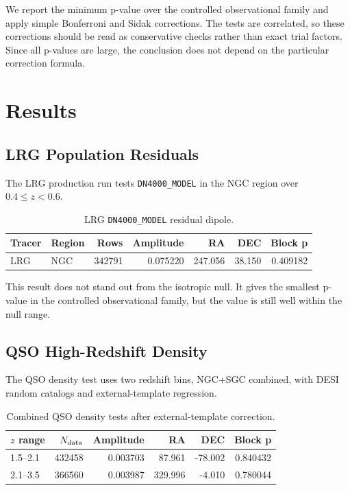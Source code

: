 \documentclass[11pt]{article}
\begin{document}
We report the minimum p-value over the controlled observational family and apply simple Bonferroni and Sidak corrections. The tests are correlated, so these corrections should be read as conservative checks rather than exact trial factors. Since all p-values are large, the conclusion does not depend on the particular correction formula.

\section{Results}

\subsection{LRG Population Residuals}

The LRG production run tests \texttt{DN4000\_MODEL} in the NGC region over $0.4 \le z < 0.6$.

\begin{table}[h]
\centering
\caption{LRG \texttt{DN4000\_MODEL} residual dipole.}
\begin{tabular}{llrrrrr}
\toprule
Tracer & Region & Rows & Amplitude & RA & DEC & Block p \\
\midrule
LRG & NGC & 342791 & 0.075220 & 247.056 & 38.150 & 0.409182 \\
\bottomrule
\end{tabular}
\end{table}

This result does not stand out from the isotropic null. It gives the smallest p-value in the controlled observational family, but the value is still well within the null range.

\subsection{QSO High-Redshift Density}

The QSO density test uses two redshift bins, NGC+SGC combined, with DESI random catalogs and external-template regression.

\begin{table}[h]
\centering
\caption{Combined QSO density tests after external-template correction.}
\begin{tabular}{lrrrrr}
\toprule
$z$ range & $N_{\rm data}$ & Amplitude & RA & DEC & Block p \\
\midrule
1.5--2.1 & 432458 & 0.003703 & 87.961 & -78.002 & 0.840432 \\
2.1--3.5 & 366560 & 0.003987 & 329.996 & -4.010 & 0.780044 \\
\bottomrule
\end{tabular}
\end{table}
\end{document}
